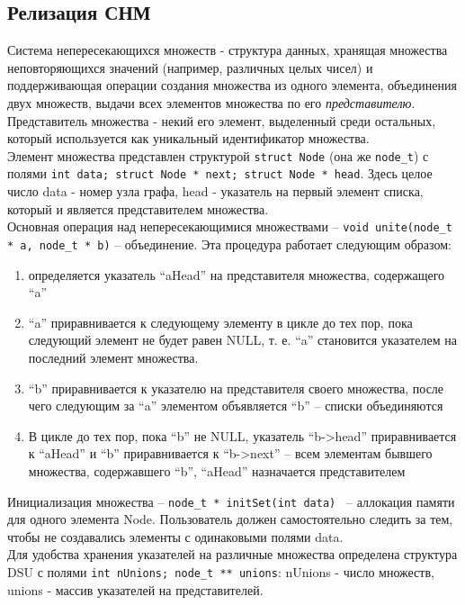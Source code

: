 \documentclass[zuev-report.tex]{subfiles}
\begin{document}
\subsection{Релизация СНМ}
Система непересекающихся множеств - структура данных, хранящая множества неповторяющихся значений (например, различных целых чисел) и поддерживающая операции создания множества из одного элемента, объединения двух множеств, выдачи всех элементов множества по его \textit{представителю}. Представитель множества - некий его элемент, выделенный среди остальных, который используется как уникальный идентификатор множества.\\
Элемент множества представлен структурой \lstinline|struct Node| (она же \lstinline|node_t|) с полями \lstinline|int data; struct Node * next; struct Node * head|. Здесь целое число data - номер узла графа, head - указатель на первый элемент списка, который и является представителем множества. \\
Основная операция над непересекающимися множествами -- \lstinline|void unite(node_t * a, node_t * b)| -- объединение. Эта процедура работает следующим образом:\\

\begin{enumerate}
	\item определяется указатель "`aHead"' на представителя множества, содержащего "`a"'
	\item "`a"' приравнивается к следующему элементу в цикле до тех пор, пока следующий элемент не будет равен NULL, т. е. "`a"' становится указателем на последний элемент множества.
	\item "`b"' приравнивается к указателю на представителя своего множества, после чего следующим за "`a"' элементом объявляется "`b"' -- списки объединяются
	\item В цикле до тех пор, пока "`b"' не NULL, указатель "`b->head"' приравнивается к "`aHead"' и "`b"' приравнивается к "`b->next"' -- всем элементам бывшего множества, содержавшего "`b"', "`aHead"' назначается представителем
\end{enumerate}
Инициализация множества -- \lstinline|node_t * initSet(int data) | -- аллокация памяти для одного элемента Node. Пользователь должен самостоятельно следить за тем, чтобы не создавались элементы с одинаковыми полями data.\\
Для удобства хранения указателей на различные множества определена структура DSU с полями \lstinline|int nUnions; node_t ** unions|: nUnions - число множеств, unions - массив указателей на представителей.\\
\end{document}

